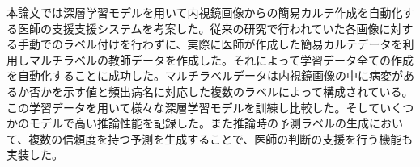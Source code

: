 本論文では深層学習モデルを用いて内視鏡画像からの簡易カルテ作成を自動化する医師の支援支援システムを考案した。従来の研究で行われていた各画像に対する手動でのラベル付けを行わずに、実際に医師が作成した簡易カルテデータを利用しマルチラベルの教師データを作成した。それによって学習データ全ての作成を自動化することに成功した。マルチラベルデータは内視鏡画像の中に病変があるか否かを示す値と頻出病名に対応した複数のラベルによって構成されている。この学習データを用いて様々な深層学習モデルを訓練し比較した。そしていくつかのモデルで高い推論性能を記録した。また推論時の予測ラベルの生成において、複数の信頼度を持つ予測を生成することで、医師の判断の支援を行う機能も実装した。
